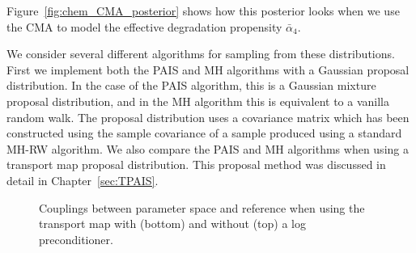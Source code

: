 \documentclass[final]{siamltex}
\newcommand\irregularcircle[2]{%
  \pgfextra {\pgfmathsetmacro\len{(#1)+rand*(#2)}}
  +(0:\len pt)
  \foreach \a in {10,20,...,350}{
    \pgfextra {\pgfmathsetmacro\len{(#1)+rand*(#2)}}
    -- +(\a:\len pt)
  } -- cycle
}
\begin{document}
Figure~\ref{fig:chem_CMA_posterior} shows how this posterior looks
when we use the CMA to model the effective degradation propensity $\bar{\alpha}_4$.

We consider several different algorithms for sampling from these
distributions. First we implement both the PAIS and MH algorithms with
a Gaussian proposal distribution. In the case of the PAIS algorithm,
this is a Gaussian mixture proposal distribution, and in the MH
algorithm this is equivalent to a vanilla random walk. The proposal distribution uses a covariance matrix which has been constructed using the sample covariance of a sample produced using a standard MH-RW algorithm. We also compare the PAIS and MH algorithms when using a transport map proposal distribution. This proposal method was discussed in detail in Chapter~\ref{sec:TPAIS}.

\begin{figure}
	\centering

	\caption{Couplings between parameter space and reference
          when using the transport map with (bottom) and without (top)
        a log preconditioner.}
	\label{fig:chem_coupling}
\end{figure}
\end{document}
